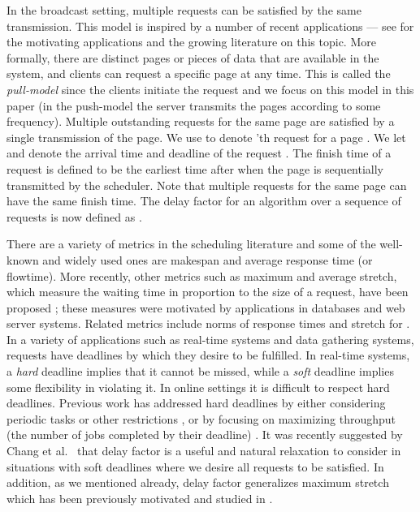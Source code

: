 \documentclass[11pt]{article}
\newcommand{\etal}{et al.\ }
\begin{document}
In the broadcast setting, multiple requests can be satisfied by the
same transmission. This model is inspired by a number of recent
applications --- see \cite{BarnoyBNS98, AksoyF98, AcharyaFZ95,
  BartalM00} for the motivating applications and the growing
literature on this topic. More formally, there are  distinct pages
or pieces of data that are available in the system, and clients can
request a specific page at any time. This is called the {\em
  pull-model} since the clients initiate the request and we focus on
this model in this paper (in the push-model the server transmits the
pages according to some frequency). Multiple outstanding requests for
the same page are satisfied by a single transmission of the page. We
use  to denote 'th request for a page . We let  and  denote the arrival
time and deadline of the request . The finish time
 of a request  is defined to be the earliest time after
 when the page  is sequentially transmitted by the
scheduler. Note that multiple requests for the same page can have the
same finish time. The delay factor  for an algorithm  over
a sequence of requests  is now defined as .

\medskip
{} There are a variety of metrics in the
scheduling literature and some of the well-known and widely used ones
are makespan and average response time (or flowtime). More recently,
other metrics such as maximum and average stretch, which measure the
waiting time in proportion to the size of a request, have been
proposed \cite{BenderCM98, Karger99, Sgall98}; these measures were
motivated by applications in databases and web server systems. Related
metrics include  norms of response times and stretch
\cite{BansalP03, AvrahamiA03, ChekuriGKK04} for . In
a variety of applications such as real-time systems and data gathering
systems, requests have deadlines by which they desire to be
fulfilled. In real-time systems, a {\em hard} deadline implies that it
cannot be missed, while a {\em soft} deadline implies some flexibility
in violating it. In online settings it is difficult to respect hard
deadlines. Previous work has addressed hard deadlines by either
considering periodic tasks or other restrictions \cite{Burnsb08}, or
by focusing on maximizing throughput (the number of jobs completed by
their deadline) \cite{Kimc04, ChanLTW04, ZhengFCCPW06}. It was
recently suggested by Chang \etal \cite{ChangEGK08} that delay factor
is a useful and natural relaxation to consider in situations with soft
deadlines where we desire all requests to be satisfied. In addition,
as we mentioned already, delay factor generalizes maximum stretch
which has been previously motivated and studied in
\cite{BenderCM98,BenderMR02}.
\end{document}
